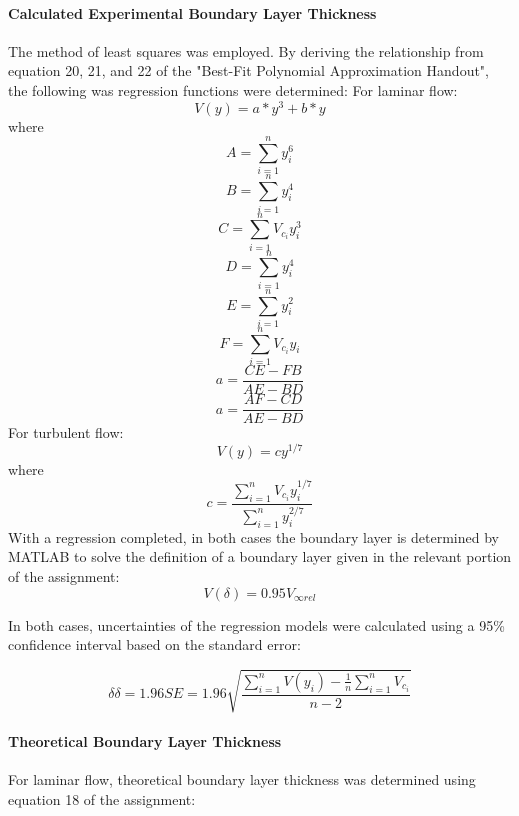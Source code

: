 \documentclass[12pt]{article}
\begin{document}
	\paragraph{Calculated Experimental Boundary Layer Thickness} The method of least squares was employed. By deriving the relationship from equation 20, 21, and 22 of the "Best-Fit Polynomial Approximation Handout", the following was regression functions were determined:
	\hfill\break
	For laminar flow:
	\begin{equation}
		V(y) = a*y^3 + b*y
	\end{equation}
	where
	$$ A = \sum_{i=1}^{n}{y_i^6}$$
	$$ B = \sum_{i=1}^{n}{y_i^4}$$
	$$ C = \sum_{i=1}^{n}{V_{c_i} y_i^3}$$
	$$ D = \sum_{i=1}^{n}{y_i^4}$$
	$$ E = \sum_{i=1}^{n}{y_i^2}$$
	$$ F = \sum_{i=1}^{n}{V_{c_i} y_i}$$
	\begin{equation}
		a = \frac{CE- FB}{AE - BD}
	\end{equation}
	\begin{equation}
	a = \frac{AF - CD}{AE - BD}
	\end{equation}
	\hfill\break\break
	For turbulent flow:
	\begin{equation}
	V(y) = cy^{1/7}
	\end{equation}
	where
	\begin{equation}
	c = \frac{\sum_{i=1}^{n}{V_{c_i} y_i^{1/7}}}{\sum_{i=1}^{n}{y_i^{2/7}}}
	\end{equation}
	\hfill\break\break
	With a regression completed, in both cases the boundary layer is determined by MATLAB to solve the definition of a boundary layer given in the relevant portion of the assignment:
	\begin{equation}
		V(\delta) = 0.95V_{\infty rel}
	\end{equation}
	
	\hfill\break\break
	In both cases, uncertainties of the regression models were calculated using a 95\% confidence interval based on the standard error:
	
	\begin{equation}
	\delta \delta = 1.96SE = 1.96\sqrt{\frac{\sum_{i=1}^{n}{V(y_i) - \frac{1}{n}\sum_{i=1}^{n}{V_{c_i}}}}{n-2}}
	\end{equation}
	
	
	\paragraph{Theoretical Boundary Layer Thickness}
	For laminar flow, theoretical boundary layer thickness was determined using equation 18 of the assignment:
	
\end{document}
